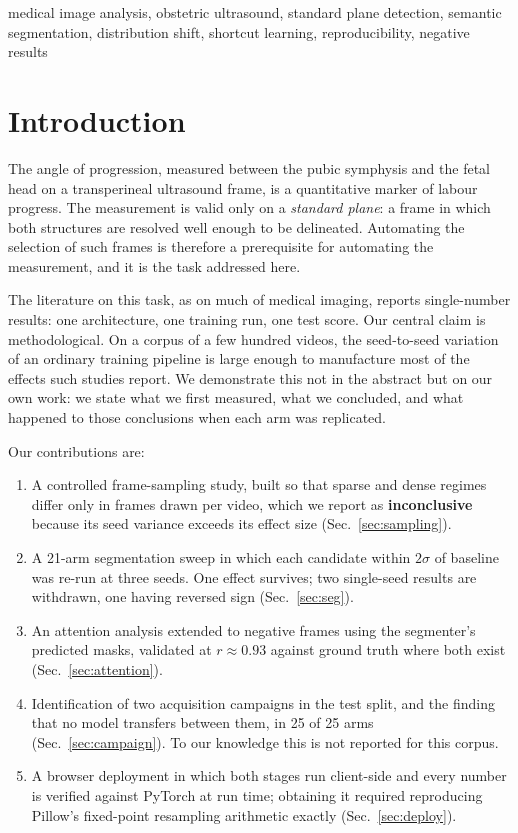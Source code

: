\documentclass[conference]{IEEEtran}
\begin{document}
\begin{IEEEkeywords}
medical image analysis, obstetric ultrasound, standard plane detection,
semantic segmentation, distribution shift, shortcut learning, reproducibility,
negative results
\end{IEEEkeywords}

\section{Introduction}

The angle of progression, measured between the pubic symphysis and the fetal
head on a transperineal ultrasound frame, is a quantitative marker of labour
progress. The measurement is valid only on a \emph{standard plane}: a frame in
which both structures are resolved well enough to be delineated. Automating the
selection of such frames is therefore a prerequisite for automating the
measurement, and it is the task addressed here.

The literature on this task, as on much of medical imaging, reports
single-number results: one architecture, one training run, one test score. Our
central claim is methodological. On a corpus of a few hundred videos, the
seed-to-seed variation of an ordinary training pipeline is large enough to
manufacture most of the effects such studies report. We demonstrate this not in
the abstract but on our own work: we state what we first measured, what we
concluded, and what happened to those conclusions when each arm was replicated.

Our contributions are:

\begin{enumerate}
\item A controlled frame-sampling study, built so that sparse and dense regimes
differ only in frames drawn per video, which we report as \textbf{inconclusive}
because its seed variance exceeds its effect size (Sec.~\ref{sec:sampling}).
\item A 21-arm segmentation sweep in which each candidate within $2\sigma$ of
baseline was re-run at three seeds. One effect survives; two single-seed
results are withdrawn, one having reversed sign (Sec.~\ref{sec:seg}).
\item An attention analysis extended to negative frames using the segmenter's
predicted masks, validated at $r\approx0.93$ against ground truth where both
exist (Sec.~\ref{sec:attention}).
\item Identification of two acquisition campaigns in the test split, and the
finding that no model transfers between them, in 25 of 25 arms
(Sec.~\ref{sec:campaign}). To our knowledge this is not reported for this
corpus.
\item A browser deployment in which both stages run client-side and every
number is verified against PyTorch at run time; obtaining it required
reproducing Pillow's fixed-point resampling arithmetic exactly
(Sec.~\ref{sec:deploy}).
\end{enumerate}
\end{document}

